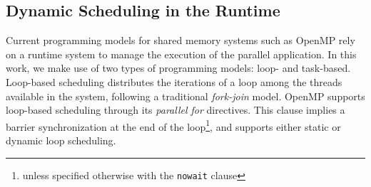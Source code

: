 


\subsection{Dynamic Scheduling in the Runtime}
\label{sec:runtime}


Current programming models for shared memory systems such as OpenMP rely on a 
runtime system to manage the execution of the parallel application. 
In this work, we make use of two types of programming models: loop- and task-based.
Loop-based scheduling distributes the iterations of a loop among the 
threads available in the system, following a traditional \textit{fork-join} model.
OpenMP supports loop-based scheduling through its \emph{parallel for} directives. 
This clause implies a barrier synchronization at the end of the loop\footnote{unless 
specified otherwise with the \texttt{nowait} clause}, and supports either static or dynamic loop 
scheduling. 

